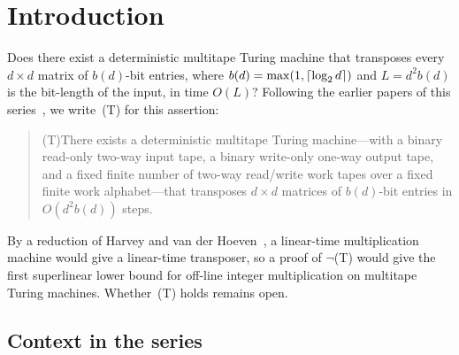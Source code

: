 \section{Introduction}\label{sec:intro}

Does there exist a deterministic multitape Turing machine that transposes every $d \times d$ matrix of $b(d)$-bit entries,
where $b(d) = \max(1, \lceil \log_2 d \rceil)$ and $L = d^2 b(d)$ is the bit-length of the input, in time $O(L)$? Following the earlier
papers of this series~\cite{FirstPaper2026}, we write~(T) for this assertion:
\begin{quote}
(T)\quad There exists a deterministic multitape Turing machine---with a binary read-only two-way input tape, a binary
write-only one-way output tape, and a fixed finite number of two-way read/write work tapes over a fixed finite work
alphabet---that transposes $d \times d$ matrices of $b(d)$-bit entries in $O(d^2 b(d))$ steps.
\end{quote}
By a reduction of Harvey and van der Hoeven~\cite[Cor.~6.9]{HvdH2025}, a linear-time multiplication machine would
give a linear-time transposer, so a proof of $\neg$(T) would give the first superlinear lower bound for off-line
integer multiplication on multitape Turing machines. Whether~(T) holds remains open.

\subsection{Context in the series}


